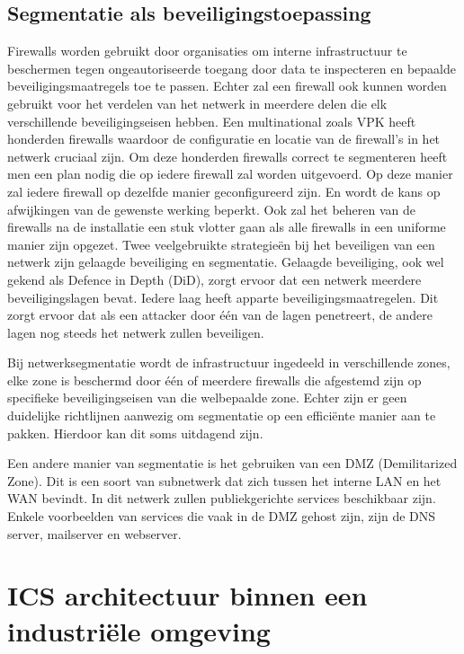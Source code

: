 \subsection{Segmentatie als beveiligingstoepassing}
Firewalls worden gebruikt door organisaties om interne infrastructuur te beschermen tegen ongeautoriseerde toegang door data te inspecteren en bepaalde beveiligingsmaatregels toe te passen. Echter zal een firewall ook kunnen worden gebruikt voor het verdelen van het netwerk in meerdere delen die elk verschillende beveiligingseisen hebben. Een multinational zoals VPK heeft honderden firewalls waardoor de configuratie en locatie van de firewall’s in het netwerk cruciaal zijn. Om deze honderden firewalls correct te segmenteren heeft men een plan nodig die op iedere firewall zal worden uitgevoerd. Op deze manier zal iedere firewall op dezelfde manier geconfigureerd zijn. En wordt de kans op afwijkingen van de gewenste werking beperkt. Ook zal het beheren van de firewalls na de installatie een stuk vlotter gaan als alle firewalls in een uniforme manier zijn opgezet.
Twee veelgebruikte strategieën bij het beveiligen van een netwerk zijn gelaagde beveiliging en segmentatie. Gelaagde beveiliging, ook wel gekend als Defence in Depth (DiD), zorgt ervoor dat een netwerk meerdere beveiligingslagen bevat. Iedere laag heeft apparte beveiligingsmaatregelen. Dit zorgt ervoor dat als een attacker door één van de lagen penetreert, de andere lagen nog steeds het netwerk zullen beveiligen. \autocite{FortinetDE2025} 

\vspace{5mm}
Bij netwerksegmentatie wordt de infrastructuur ingedeeld in verschillende zones, elke zone is beschermd door één of meerdere firewalls die afgestemd zijn op specifieke beveiligingseisen van die welbepaalde zone. Echter zijn er geen duidelijke richtlijnen aanwezig om segmentatie op een efficiënte manier aan te pakken. Hierdoor kan dit soms uitdagend zijn. \autocite{Mhaskar2021}

\vspace{5mm}
Een andere manier van segmentatie is het gebruiken van een DMZ (Demilitarized Zone). Dit is een soort van subnetwerk dat zich tussen het interne LAN en het WAN bevindt. In dit netwerk zullen publiekgerichte services beschikbaar zijn. Enkele voorbeelden van services die vaak in de DMZ gehost zijn, zijn de DNS server, mailserver en webserver. \autocite{Patel2020}



\section{ICS architectuur binnen een industriële omgeving}

